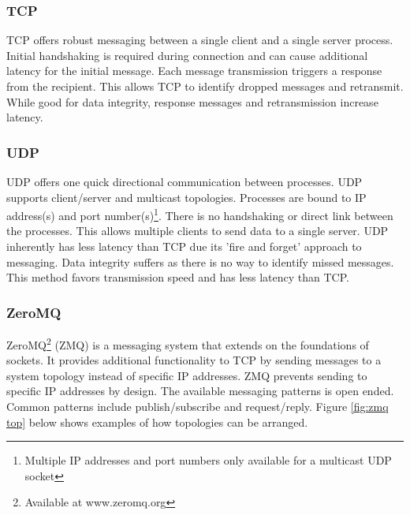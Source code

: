 \subsubsection{TCP}

TCP offers robust messaging between a single client and a single server process. Initial handshaking is required during connection and can cause additional latency for the initial message\cite{UDPTCP}. Each message transmission triggers a response from the recipient. This allows TCP to identify dropped messages and retransmit\cite{UDPTCP}. While good for data integrity, response messages and retransmission increase latency. 

\subsubsection{UDP}

UDP offers one quick directional communication between processes. UDP supports client/server and multicast topologies. Processes are bound to IP address(s) and port number(s)\footnote{Multiple IP addresses and port numbers only available for a multicast UDP socket}. There is no handshaking or direct link between the processes. This allows multiple clients to send data to a single server. UDP inherently has less latency than TCP due its 'fire and forget' approach to messaging. Data integrity suffers as there is no way to identify missed messages\cite{UDPTCP}. This method favors transmission speed and has less latency than TCP.

\subsubsection{ZeroMQ}

ZeroMQ\footnote{Available at www.zeromq.org} (ZMQ) is a messaging system that extends on the foundations of sockets. It provides additional functionality to TCP by sending messages to a system topology instead of specific IP addresses\cite{ZMQTHEORY}. ZMQ prevents sending to specific IP addresses by design. The available messaging patterns is open ended. Common patterns include publish/subscribe and request/reply\cite{ZMQTHEORY, MULTITHREADZMQ}. Figure \ref{fig:zmq top} below shows examples of how topologies can be arranged.

